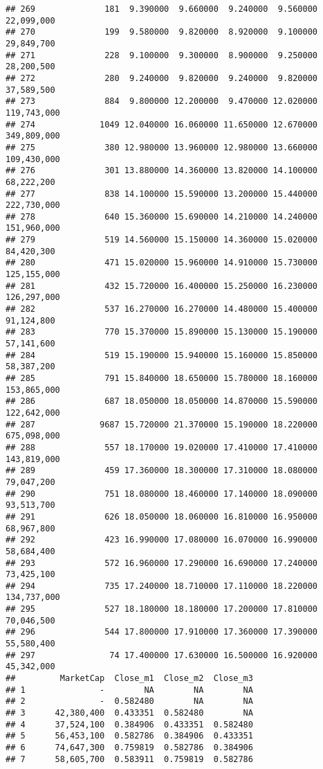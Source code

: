 \documentclass[]{article}
\begin{document}
\begin{verbatim}
## 269              181  9.390000  9.660000  9.240000  9.560000  22,099,000
## 270              199  9.580000  9.820000  8.920000  9.100000  29,849,700
## 271              228  9.100000  9.300000  8.900000  9.250000  28,200,500
## 272              280  9.240000  9.820000  9.240000  9.820000  37,589,500
## 273              884  9.800000 12.200000  9.470000 12.020000 119,743,000
## 274             1049 12.040000 16.060000 11.650000 12.670000 349,809,000
## 275              380 12.980000 13.960000 12.980000 13.660000 109,430,000
## 276              301 13.880000 14.360000 13.820000 14.100000  68,222,200
## 277              838 14.100000 15.590000 13.200000 15.440000 222,730,000
## 278              640 15.360000 15.690000 14.210000 14.240000 151,960,000
## 279              519 14.560000 15.150000 14.360000 15.020000  84,420,300
## 280              471 15.020000 15.960000 14.910000 15.730000 125,155,000
## 281              432 15.720000 16.400000 15.250000 16.230000 126,297,000
## 282              537 16.270000 16.270000 14.480000 15.400000  91,124,800
## 283              770 15.370000 15.890000 15.130000 15.190000  57,141,600
## 284              519 15.190000 15.940000 15.160000 15.850000  58,387,200
## 285              791 15.840000 18.650000 15.780000 18.160000 153,865,000
## 286              687 18.050000 18.050000 14.870000 15.590000 122,642,000
## 287             9687 15.720000 21.370000 15.190000 18.220000 675,098,000
## 288              557 18.170000 19.020000 17.410000 17.410000 143,819,000
## 289              459 17.360000 18.300000 17.310000 18.080000  79,047,200
## 290              751 18.080000 18.460000 17.140000 18.090000  93,513,700
## 291              626 18.050000 18.060000 16.810000 16.950000  68,967,800
## 292              423 16.990000 17.080000 16.070000 16.990000  58,684,400
## 293              572 16.960000 17.290000 16.690000 17.240000  73,425,100
## 294              735 17.240000 18.710000 17.110000 18.220000 134,737,000
## 295              527 18.180000 18.180000 17.200000 17.810000  70,046,500
## 296              544 17.800000 17.910000 17.360000 17.390000  55,580,400
## 297               74 17.400000 17.630000 16.500000 16.920000  45,342,000
##         MarketCap  Close_m1  Close_m2  Close_m3
## 1               -        NA        NA        NA
## 2               -  0.582480        NA        NA
## 3      42,380,400  0.433351  0.582480        NA
## 4      37,524,100  0.384906  0.433351  0.582480
## 5      56,453,100  0.582786  0.384906  0.433351
## 6      74,647,300  0.759819  0.582786  0.384906
## 7      58,605,700  0.583911  0.759819  0.582786

\end{verbatim}
\end{document}
